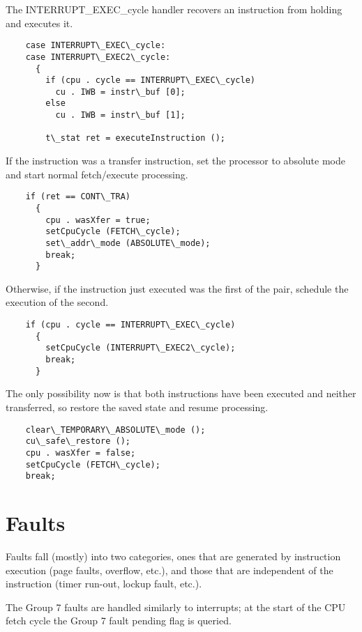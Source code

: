 \documentclass[notitlepage]{report}
\begin{document}
The INTERRUPT\_EXEC\_cycle handler recovers an instruction from holding and executes it.

\begin{verbatim}
    case INTERRUPT\_EXEC\_cycle:
    case INTERRUPT\_EXEC2\_cycle:
      {
        if (cpu . cycle == INTERRUPT\_EXEC\_cycle)
          cu . IWB = instr\_buf [0];
        else
          cu . IWB = instr\_buf [1];

        t\_stat ret = executeInstruction ();
\end{verbatim}

If the instruction was a transfer instruction, set the processor to absolute mode and start
normal fetch/execute processing.

\begin{verbatim}
    if (ret == CONT\_TRA)
      {
        cpu . wasXfer = true;
        setCpuCycle (FETCH\_cycle);
        set\_addr\_mode (ABSOLUTE\_mode);
        break;
      }
\end{verbatim}

Otherwise, if the instruction just executed was the first of the pair, schedule the execution of
the second.

\begin{verbatim}
    if (cpu . cycle == INTERRUPT\_EXEC\_cycle)
      {
        setCpuCycle (INTERRUPT\_EXEC2\_cycle);
        break;
      }
\end{verbatim}

The only possibility now is that both instructions have been executed and neither transferred, so restore
the saved state and resume processing.

\begin{verbatim}
    clear\_TEMPORARY\_ABSOLUTE\_mode ();
    cu\_safe\_restore ();
    cpu . wasXfer = false;
    setCpuCycle (FETCH\_cycle);
    break;
\end{verbatim}
 
\section{Faults}

Faults fall (mostly) into two categories, ones that are generated by instruction execution (page faults,
overflow, etc.), and those that are independent of the instruction (timer run-out, lockup fault, etc.).


The Group 7 faults are handled similarly to interrupts; at the start of the CPU fetch cycle the
Group 7 fault pending flag is queried.
\end{document}
